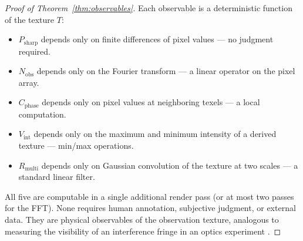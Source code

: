 \documentclass[11pt,twocolumn,a4paper]{article}
\begin{document}
\begin{proof}[Proof of Theorem~\ref{thm:observables}]
Each observable is a deterministic function of the texture $T$:
\begin{itemize}[leftmargin=*]
\item $P_{\mathrm{sharp}}$ depends only on finite differences of
  pixel values --- no judgment required.
\item $N_{\mathrm{obs}}$ depends only on the Fourier transform ---
  a linear operator on the pixel array.
\item $C_{\mathrm{phase}}$ depends only on pixel values at
  neighboring texels --- a local computation.
\item $V_{\mathrm{int}}$ depends only on the maximum and minimum
  intensity of a derived texture --- min/max operations.
\item $R_{\mathrm{multi}}$ depends only on Gaussian convolution
  of the texture at two scales --- a standard linear filter.
\end{itemize}
All five are computable in a single additional render pass (or at most
two passes for the FFT). None requires human annotation, subjective
judgment, or external data. They are physical observables of the
observation texture, analogous to measuring the visibility of an
interference fringe in an optics experiment
\citep{bornwolf1999,michelson1891}. \qedhere
\end{proof}

\end{document}
